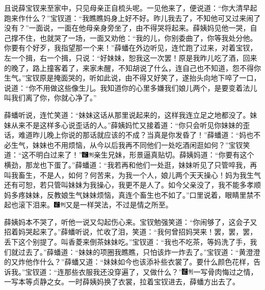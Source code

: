 且说薛宝钗来至家中，只见母亲正自梳头呢。一见他来了，便说道：“你大清早起跑来作什么？”宝钗道：“我瞧瞧妈身上好不好。昨儿我去了，不知他可又过来闹了没有？”一面说，一面在他母亲身旁坐了，由不得哭将起来。薛姨妈见他一哭，自己撑不住，也就哭了一场，一面又劝他：“我的儿，你别委曲了，你等我处分他。你要有个好歹，我指望那一个来！”薛蟠在外边听见，连忙跑了过来，对着宝钗，左一个揖，右一个揖，只说：“好妹妹，恕我这一次罢！原是我昨儿吃了酒，回来的晚了，路上撞客着了，来家未醒，不知胡说了什么，连自己也不知道，怨不得你生气。”宝钗原是掩面哭的，听如此说，由不得又好笑了，遂抬头向地下啐了一口，说道：“你不用做这些像生儿。我知道你的心里多嫌我们娘儿两个，是要变着法儿叫我们离了你，你就心净了。”

薛蟠听说，连忙笑道：“妹妹这话从那里说起来的，这样我连立足之地都没了。妹妹从来不是这样多心说歪话的人。”薛姨妈忙又接着道：“你只会听见你妹妹的歪话，难道昨儿晚上你说的那话就应该的不成？当真是你发昏了！”薛蟠道：“妈也不必生气，妹妹也不用烦恼，从今以后我再不同他们一处吃酒闲逛如何？”宝钗笑道：“这不明白过来了！”{\includegraphics[width=3mm]{../Images/00006}\includegraphics[width=3mm]{../Images/00011}\footnotesize \kaishu 亲生兄妹，形景逼真贴切。}薛姨妈道：“你要有这个横劲，那龙也下蛋了。”薛蟠道：“我若再和他们一处逛，妹妹听见了只管啐我，再叫我畜生，不是人，如何？何苦来，为我一个人，娘儿两个天天操心！妈为我生气还有可恕，若只管叫妹妹为我操心，我更不是人了。如今父亲没了，我不能多孝顺妈多疼妹妹，反教娘生气妹妹烦恼，真连个畜生也不如了。”口里说着，眼睛里禁不起也滚下泪来。{\includegraphics[width=3mm]{../Images/00006}\includegraphics[width=3mm]{../Images/00011}\footnotesize \kaishu 又是一样哭法，不过是情之所至。}

薛姨妈本不哭了，听他一说又勾起伤心来。宝钗勉强笑道：“你闹够了，这会子又招着妈哭起来了。”薛蟠听说，忙收了泪，笑道：“我何曾招妈哭来！罢，罢，罢，丢下这个别提了。叫香菱来倒茶妹妹吃。”宝钗道：“我也不吃茶，等妈洗了手，我们就过去了。”薛蟠道：“妹妹的项圈我瞧瞧，只怕该炸一炸去了。”宝钗道：“黄澄澄的又炸他作什么？”薛蟠又道：“妹妹如今也该添补些衣裳了。要什么颜色花样，告诉我。”宝钗道：“连那些衣服我还没穿遍了，又做什么？”{\includegraphics[width=3mm]{../Images/00006}\includegraphics[width=3mm]{../Images/00011}\footnotesize \kaishu 一写骨肉悔过之情，一写本等贞静之女。}一时薛姨妈换了衣裳，拉着宝钗进去，薛蟠方出去了。


